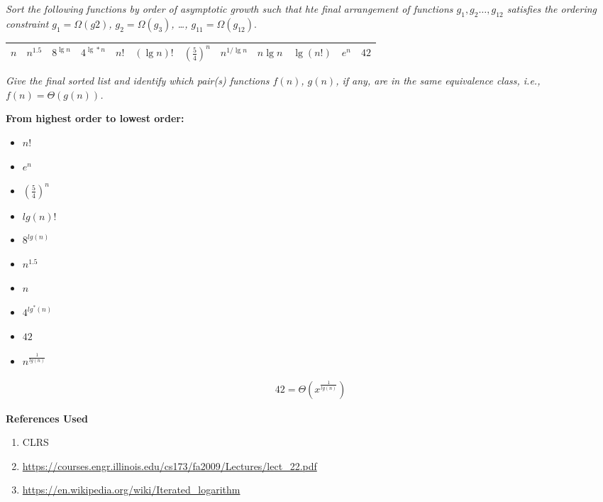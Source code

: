 \documentclass[12pt]{article} \setlength{\oddsidemargin}{0in}
\begin{document}
\begin{enumerate}
  \textit{Sort the following functions by order of asymptotic growth
    such that hte final arrangement of functions
    $g_1,g_2 \dots,g_{12}$ satisfies the ordering constraint
    $g_1 = \Omega(g2)$, $g_2 = \Omega(g_3)$, \dots , $g_{11}=\Omega(g_{12})$}.


  \begin{tabular}{|l|l|l|l|l|l|l|l|l|l|l|l|}
    \hline
    $n$ & $n^{1.5}$ & $8^{\lg n}$ & $4^{\lg* n}$ & $n!$ &$(\lg n)!$ & $(\frac{5}{4})^n$ & $n^{1/ \lg n}$ & $n \lg n$ & $\lg(n!)$ & $e^n$ & $42$ \\
    \hline
  \end{tabular}

  \textit{Give the final sorted list and identify which pair(s)
    functions $f(n)$, $g(n)$, if any, are in the same equivalence
    class, i.e., $f(n) = \Theta(g(n))$.}

  \textbf{From highest order to lowest order:}
  \begin{itemize}
    \item $n!$
    \item $e^n$
    \item $(\frac{5}{4})^n$
    \item $lg(n)!$
    \item $8^{lg(n)}$
    \item $n^{1.5}$
    \item $n$
    \item $4^{lg^*(n)}$
    \item $42$
    \item $n^{\frac{1}{lg(n)}}$
  \end{itemize}

  \begin{align}
    42 = \Theta(x^{\frac{1}{lg(n)}}) 
  \end{align}

\end{enumerate}


\newpage

\textbf{References Used}

\hrulefill

\begin{enumerate}
  \item CLRS
  \item \url{https://courses.engr.illinois.edu/cs173/fa2009/Lectures/lect_22.pdf}
  \item \url{https://en.wikipedia.org/wiki/Iterated_logarithm}
\end{enumerate}
  
\end{document}
